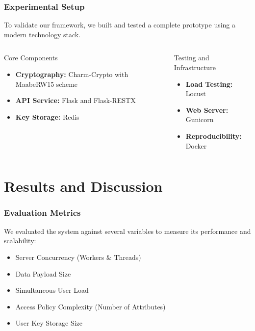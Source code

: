 \documentclass{beamer}
\begin{document}
\begin{frame}
\frametitle{Experimental Setup}
To validate our framework, we built and tested a complete prototype using a modern technology stack.

\begin{columns}[T] %
    \begin{column}{0.5\textwidth}
        \begin{block}{Core Components}
        \begin{itemize}
            \item \textbf{Cryptography:} Charm-Crypto with MaabeRW15 scheme
            \item \textbf{API Service:} Flask and Flask-RESTX
            \item \textbf{Key Storage:} Redis
        \end{itemize}
        \end{block}
    \end{column}
    
    \begin{column}{0.5\textwidth}
        \begin{block}{Testing and Infrastructure}
        \begin{itemize}
            \item \textbf{Load Testing:} Locust
            \item \textbf{Web Server:} Gunicorn
            \item \textbf{Reproducibility:} Docker
        \end{itemize}
        \end{block}
    \end{column}
\end{columns}

\end{frame}

\section{Results and Discussion}

\begin{frame}
\frametitle{Evaluation Metrics}
We evaluated the system against several variables to measure its performance and scalability:
\begin{itemize}
    \item Server Concurrency (Workers \& Threads)
    \item Data Payload Size
    \item Simultaneous User Load
    \item Access Policy Complexity (Number of Attributes)
    \item User Key Storage Size
\end{itemize}
\end{frame}
\end{document}
